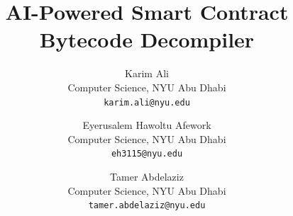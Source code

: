 \documentclass{article}
\begin{document}
\title{AI-Powered Smart Contract Bytecode Decompiler}

\author{
Karim Ali\\
Computer Science, NYU Abu Dhabi\\
\texttt{karim.ali@nyu.edu}
\and
Eyerusalem Hawoltu Afework\\
Computer Science, NYU Abu Dhabi\\
\texttt{eh3115@nyu.edu}
\and
Tamer Abdelaziz\\
Computer Science, NYU Abu Dhabi\\
\texttt{tamer.abdelaziz@nyu.edu}
}

\date{}

\maketitle
\end{document}
